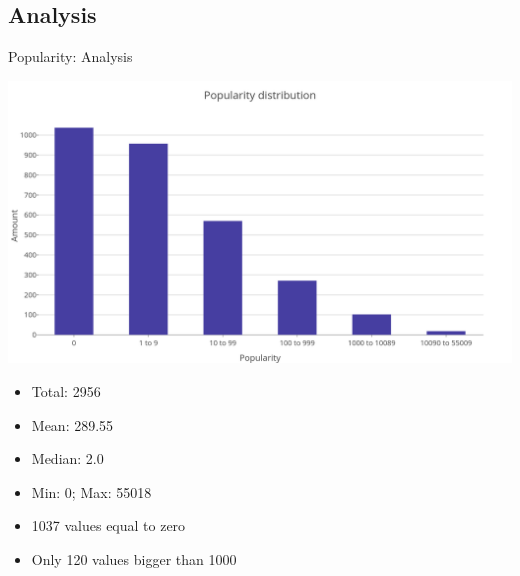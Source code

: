 \subsection{Analysis}
\begin{frame}{Popularity: Analysis}
\begin{center}
\includegraphics[scale=0.2]{graphics/popularityDistribution.png} 
\end{center}
\begin{table}[!htb]
    \begin{minipage}{.4\textwidth}
		\begin{itemize}
	\item Total: 2956
	\item Mean:    289.55
	\item Median:    2.0
		\end{itemize}
    \end{minipage}%
    \begin{minipage}{.6\textwidth}
        	\begin{itemize}
	\item Min:    0; Max:    55018
	\item 1037 values equal to zero
	\item Only 120 values bigger than 1000
		\end{itemize}
    \end{minipage}
\end{table}
\end{frame}

